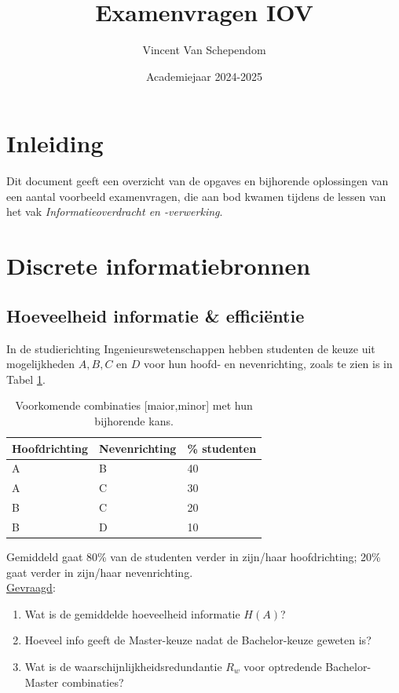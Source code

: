 \documentclass[kulak]{kulakarticle}
\title{Examenvragen IOV}
\author{Vincent Van Schependom}
\date{Academiejaar 2024-2025}
\begin{document}
	\maketitle

	\section*{Inleiding}

	Dit document geeft een overzicht van de opgaves en bijhorende oplossingen van een aantal voorbeeld examenvragen, die aan bod kwamen tijdens de lessen van het vak \textit{Informatieoverdracht en -verwerking}.

	\section{Discrete informatiebronnen}

	\subsection{Hoeveelheid informatie \& efficiëntie}

	In de studierichting Ingenieurswetenschappen hebben studenten de keuze uit mogelijkheden \(A, B, C\) en \(D\) voor hun hoofd- en nevenrichting, zoals te zien is in Tabel \ref{tab:mogelijkheden}.

	\begin{table}[h!]
		\centering
		\begin{tabular}{l | l | l}
		Hoofdrichting & Nevenrichting & \% studenten \\ \hline
		A & B & 40 \\
		A & C & 30 \\
		B & C & 20 \\
		B & D & 10
		\end{tabular}
		\caption{Voorkomende combinaties [maior,minor] met hun bijhorende kans.}
		\label{tab:mogelijkheden}
	\end{table}

	Gemiddeld gaat 80\% van de studenten verder in zijn/haar hoofdrichting; 20\% gaat verder in zijn/haar nevenrichting.\\

	\underline{Gevraagd}:
	\begin{enumerate}
		\item Wat is de gemiddelde hoeveelheid informatie \(H(A)\)?
		\item Hoeveel info geeft de Master-keuze nadat de Bachelor-keuze geweten is?
		\item Wat is de waarschijnlijkheidsredundantie \(R_w\) voor optredende Bachelor-Master combinaties?
	\end{enumerate}
\end{document}
